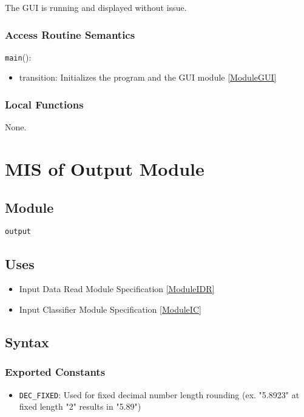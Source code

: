 \documentclass[12pt, titlepage]{article}
\def\code#1{\texttt{#1}}
\begin{document}
The GUI is running and displayed without issue.

\subsubsection{Access Routine Semantics}

\noindent \code{main}():
\begin{itemize}
  \item transition: Initializes the program and the GUI module \ref{ModuleGUI}
\end{itemize}

\subsubsection{Local Functions}

None.

\section{MIS of Output Module} \label{ModuleO} 


\subsection{Module}

\code{output}

\subsection{Uses}

\begin{itemize}
  \item Input Data Read Module Specification \ref{ModuleIDR}
  \item Input Classifier Module Specification \ref{ModuleIC}
\end{itemize}

\subsection{Syntax}

\subsubsection{Exported Constants}

\begin{itemize}
  \item \code{DEC_FIXED}: Used for fixed decimal number length rounding (ex. "5.8923" at fixed length "2" results in "5.89")
\end{itemize}
\end{document}
